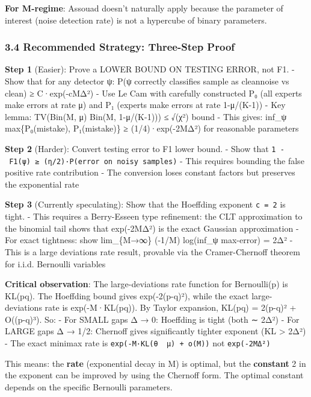 \documentclass[
  12pt,
]{article}
\begin{document}
\textbf{For M-regime}: Assouad doesn't naturally apply because the
parameter of interest (noise detection rate) is not a hypercube of
binary parameters.

\subsubsection{3.4 Recommended Strategy: Three-Step
Proof}\label{recommended-strategy-three-step-proof}

\textbf{Step 1} (Easier): Prove a LOWER BOUND ON TESTING ERROR, not F1.
- Show that for any detector ψ: P(ψ correctly classifies sample as
clean\textbar noise vs clean) ≥ C·exp(-cMΔ²) - Use Le Cam with carefully
constructed P₀ (all experts make errors at rate μ) and P₁ (experts make
errors at rate 1-μ/(K-1)) - Key lemma: TV(Bin(M, μ) \textbar\textbar{}
Bin(M, 1-μ/(K-1))) ≤ √(χ²) bound - This gives: inf\_ψ max\{P₀(mistake),
P₁(mistake)\} ≥ (1/4)·exp(-2MΔ²) for reasonable parameters

\textbf{Step 2} (Harder): Convert testing error to F1 lower bound. -
Show that \texttt{1\ -\ F1(ψ)\ ≥\ (η/2)·P(error\ on\ noisy\ samples)} -
This requires bounding the false positive rate contribution - The
conversion loses constant factors but preserves the exponential rate

\textbf{Step 3} (Currently speculating): Show that the Hoeffding
exponent \texttt{c\ =\ 2} is tight. - This requires a Berry-Esseen type
refinement: the CLT approximation to the binomial tail shows that
exp(-2MΔ²) is the exact Gaussian approximation - For exact tightness:
show lim\_\{M→∞\} (-1/M) log(inf\_ψ max-error) = 2Δ² - This is a large
deviations rate result, provable via the Cramer-Chernoff theorem for
i.i.d. Bernoulli variables

\textbf{Critical observation}: The large-deviations rate function for
Bernoulli(p) is KL(p\textbar\textbar q). The Hoeffding bound gives
exp(-2(p-q)²), while the exact large-deviations rate is
exp(-M·KL(p\textbar\textbar q)). By Taylor expansion,
KL(p\textbar\textbar q) = 2(p-q)² + O((p-q)³). So: - For SMALL gaps Δ →
0: Hoeffding is tight (both ∼ 2Δ²) - For LARGE gaps Δ → 1/2: Chernoff
gives significantly tighter exponent (KL \textgreater{} 2Δ²) - The exact
minimax rate is \texttt{exp(-M·KL(θ\ \textbar{}\textbar{}\ μ)\ +\ o(M))}
not \texttt{exp(-2MΔ²)}

This means: the \textbf{rate} (exponential decay in M) is optimal, but
the \textbf{constant} 2 in the exponent can be improved by using the
Chernoff form. The optimal constant depends on the specific Bernoulli
parameters.
\end{document}
